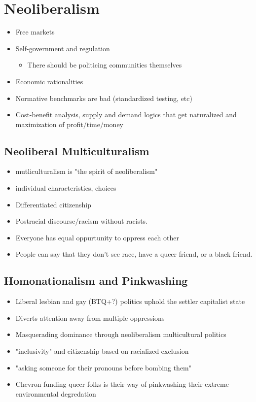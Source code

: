 \documentclass{article}
\begin{document}
\section{Neoliberalism}
\begin{itemize}
  \item Free markets
  \item Self-government and regulation
    \begin{itemize}
      \item There should be politicing communities themselves
    \end{itemize}
  \item Economic rationalities
  \item Normative benchmarks are bad (standardized testing, etc)
  \item Cost-benefit analysis, supply and demand logics that get naturalized
    and maximization of profit/time/money
\end{itemize}

\subsection{Neoliberal Multiculturalism}
\begin{itemize}
  \item mutliculturalism is "the spirit of neoliberalism"
  \item individual characteristics, choices
  \item Differentiated citizenship
  \item Postracial discourse/racism without racists.
  \item Everyone has equal oppurtunity to oppress each other
  \item People can say that they don't see race, have a queer friend, or a black friend.
\end{itemize}

\subsection{Homonationalism and Pinkwashing}
\begin{itemize}
  \item Liberal lesbian and gay (BTQ+?) politics uphold the settler capitalist state
  \item Diverts attention away from multiple oppressions
  \item Masquerading dominance through neoliberalism multicultural politics
  \item "inclusivity" and citizenship based on racialized exclusion
  \item "asking someone for their pronouns before bombing them"
  \item Chevron funding queer folks is their way of pinkwashing their
    extreme environmental degredation
\end{itemize}
\end{document}
